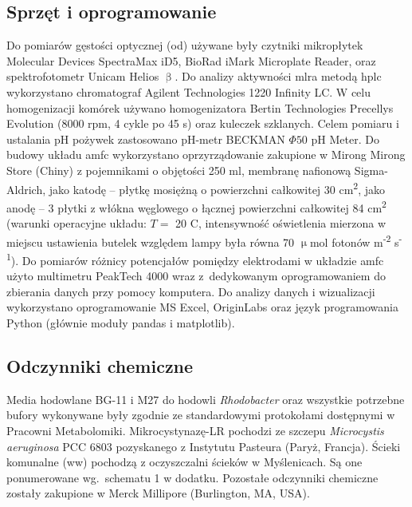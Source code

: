 \subsection{Sprzęt i oprogramowanie}\label{subsec:sprzet}
Do pomiarów gęstości optycznej (\acrshort{od}) używane były czytniki mikropłytek
Molecular Devices SpectraMax iD5, BioRad iMark
Microplate Reader, oraz spektrofotometr Unicam Helios $\upbeta$.
Do analizy aktywności \acrshort{mlra} metodą \acrshort{hplc} wykorzystano chromatograf
Agilent Technologies 1220 Infinity LC\@.
W celu homogenizacji komórek używano homogenizatora
Bertin Technologies Precellys Evolution (8000 rpm, 4 cykle po 45 s)
oraz kuleczek szklanych.
Celem pomiaru i ustalania pH pożywek zastosowano pH-metr
BECKMAN $\Phi 50$ pH Meter.
Do budowy układu \acrshort{amfc} wykorzystano oprzyrządowanie
zakupione w Mirong Mirong Store (Chiny) z pojemnikami
o objętości 250 ml, membranę nafionową Sigma-Aldrich,
jako katodę -- płytkę mosiężną o powierzchni całkowitej 30
cm\textsuperscript{2}, jako anodę -- 3 płytki z włókna węglowego
o łącznej powierzchni całkowitej 84 cm\textsuperscript{2}
(warunki operacyjne układu:
$T =$ 20 \degree C, intensywność oświetlenia mierzona w miejscu
ustawienia butelek względem lampy była równa
70 $\upmu$mol fotonów m\textsuperscript{-2} s\textsuperscript{-1}).
Do pomiarów różnicy potencjałów pomiędzy elektrodami
w układzie \acrshort{amfc} użyto multimetru PeakTech 4000 wraz
z~dedykowanym oprogramowaniem do zbierania danych przy pomocy komputera.
Do analizy danych i wizualizacji wykorzystano oprogramowanie
MS Excel, OriginLabs oraz język programowania Python
(głównie moduły pandas i matplotlib).

\subsection{Odczynniki chemiczne}\label{subsec:odczynniki}
Media hodowlane BG-11 i M27 do hodowli \textit{Rhodobacter} oraz
wszystkie potrzebne bufory wykonywane były zgodnie ze standardowymi
protokołami dostępnymi w Pracowni Metabolomiki.
Mikrocystynazę-LR pochodzi ze szczepu \textit{Microcystis aeruginosa} PCC 6803
pozyskanego z Instytutu Pasteura (Paryż, Francja).
Ścieki komunalne (\acrshort{ww}) pochodzą z oczyszczalni ścieków w Myślenicach.
Są one ponumerowane wg.\ schematu 1 w dodatku.
Pozostałe odczynniki chemiczne zostały zakupione
w Merck Millipore (Burlington, MA, USA).


